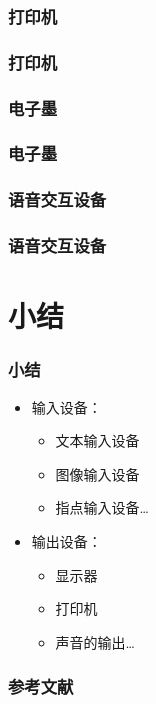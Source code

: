 \documentclass{beamer}
\begin{document}
\subsubsection{打印机}
\begin{frame}
	\frametitle{打印机}

\end{frame}

\subsubsection{电子墨}
\begin{frame}
	\frametitle{电子墨}

\end{frame}

\subsubsection{语音交互设备}
\begin{frame}
	\frametitle{语音交互设备}

\end{frame}

\section{小结}
\begin{frame}
	\frametitle{小结}
	\begin{itemize}
		\item 输入设备：
		\begin{itemize}
			\item 文本输入设备
			\item 图像输入设备
			\item 指点输入设备\dots
		\end{itemize}
		\item 输出设备：
		\begin{itemize}
			\item 显示器 
			\item 打印机
			\item 声音的输出\dots
		\end{itemize}
	\end{itemize}
\end{frame}
 
\begin{frame}
	\frametitle{参考文献}
	
	
\end{frame}
\end{document}

